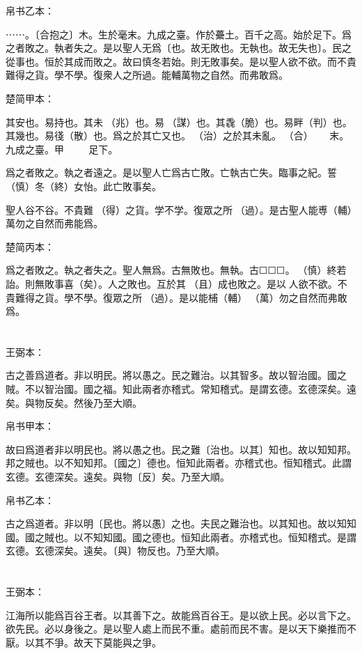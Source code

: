 \documentclass[a5paper]{ctexbook}
\begin{document}
    帛书乙本：

    ⋯⋯。〔合抱之〕木。生於毫末。九成之臺。作於虆土。百千之高。始於足下。爲之者敗之。執者失之。是以聖人无爲〔也。故无敗也。无執也。故无失也〕。民之從事也。恒於其成而敗之。故曰慎冬若始。則无敗事矣。是以聖人欲不欲。而不貴難得之貨。學不學。復衆人之所過。能輔萬物之自然。而弗敢爲。

    楚简甲本：

    其安也。易持也。其未󶵆（兆）也。易𢘃（謀）也。其毳（脆）也。易畔（判）也。其幾也。易㣤（散）也。爲之於其亡又也。𥿆（治）之於其未亂。𣌭（合）☐☐☐☐☐☐末。九成之臺。甲☐☐☐☐☐☐☐☐☐足下。

    爲之者敗之。執之者遠之。是以聖人亡爲古亡敗。亡執古亡失。臨事之紀。誓（慎）冬（終）女怡。此亡敗事矣。

    聖人谷不谷。不貴難󶴫（得）之貨。学不学。復眾之所󶴬（過）。是古聖人能尃（輔）萬勿之自然而弗能爲。

    楚简丙本：

    爲之者敗之。執之者失之。聖人無爲。古無敗也。無執。古☐☐☐。󶴤（慎）終若詒。則無敗事喜（矣）。人之敗也。互於其𠭯（且）成也敗之。是以☐人欲不欲。不貴難得之貨。學不學。復眾之所󶴭（過）。是以能㭪（輔）󼧕（萬）勿之自然而弗敢爲。

    \chapter{}
    王弼本：

    古之善爲道者。非以明民。將以愚之。民之難治。以其智多。故以智治國。國之賊。不以智治國。國之福。知此兩者亦稽式。常知稽式。是謂玄德。玄德深矣。遠矣。與物反矣。然後乃至大順。

    
    帛书甲本：

    故曰爲道者非以明民也。將以愚之也。民之難〔治也。以其〕知也。故以知知邦。邦之賊也。以不知知邦。〔國之〕德也。恒知此兩者。亦稽式也。恒知稽式。此謂玄德。玄德深矣。遠矣。與物〔反〕矣。乃至大順。

    帛书乙本：

    古之爲道者。非以明〔民也。將以愚〕之也。夫民之難治也。以其知也。故以知知國。國之賊也。以不知知國。國之德也。恒知此兩者。亦稽式也。恒知稽式。是謂玄德。玄德深矣。遠矣。〔與〕物反也。乃至大順。

    \chapter{}
    王弼本：

    江海所以能爲百谷王者。以其善下之。故能爲百谷王。是以欲上民。必以言下之。欲先民。必以身後之。是以聖人處上而民不重。處前而民不害。是以天下樂推而不厭。以其不爭。故天下莫能與之爭。
\end{document}

